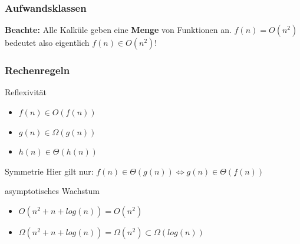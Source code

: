 \begin{frame}
			\frametitle{Aufwandsklassen}
		\begin{block}{\bf Beachte:}
		Alle Kalküle geben eine {\bf Menge} von Funktionen an. $f(n) = O(n^2)$ bedeutet also eigentlich $f(n) \in O(n^2)$!
		\end{block}
\end{frame}


\begin{frame}
			\frametitle{Rechenregeln}
			\begin{block}{Reflexivität}
                \begin{itemize}
                    \item $f(n) \in O(f(n))$
                    \item $g(n) \in \Omega(g(n))$
					\item $h(n) \in \Theta(h(n))$
                \end{itemize}
			\end{block}
			\begin{block}{Symmetrie}
					Hier gilt nur:  $f(n) \in \Theta(g(n)) \Leftrightarrow g(n) \in \Theta(f(n))$
			\end{block}
			\begin{block}{asymptotisches Wachstum}
				\begin{itemize}
                    \item $O(n^2 + n + log(n)) = O(n^2)$
                    \item $\Omega(n^2 + n + log(n)) = \Omega(n^2) \subset \Omega(log(n))$
                \end{itemize}
			\end{block}
\end{frame}

